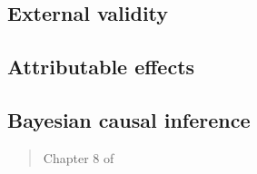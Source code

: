 \documentclass[12pt]{article}
\begin{document}
\subsection{External validity}

\begin{verse}  \end{verse}

\begin{verse}  \end{verse}

\begin{verse}  \end{verse}

\begin{verse}  \end{verse}

\subsection{Attributable effects}

\begin{verse}  \end{verse}

\begin{verse}  \end{verse}

\begin{verse}  \end{verse}

\subsection{Bayesian causal inference}

\begin{verse}  \end{verse}

\begin{verse} Chapter 8 of  \end{verse}

\begin{verse}  \end{verse}

\begin{verse}  \end{verse}
\end{document}
